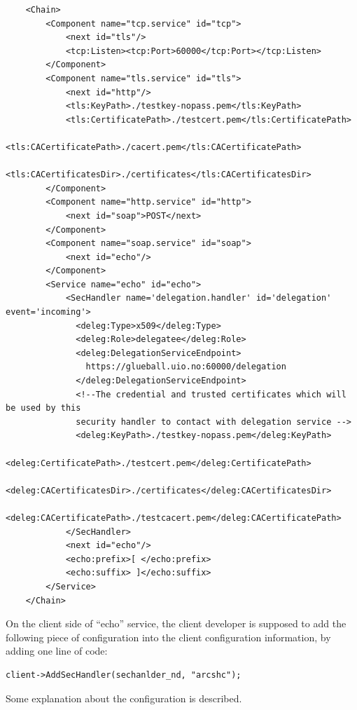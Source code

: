 \documentclass{article}                            %
\begin{document}
\begin{verbatim}
    <Chain>
        <Component name="tcp.service" id="tcp"> 
            <next id="tls"/> 
            <tcp:Listen><tcp:Port>60000</tcp:Port></tcp:Listen> 
        </Component> 
        <Component name="tls.service" id="tls"> 
            <next id="http"/> 
            <tls:KeyPath>./testkey-nopass.pem</tls:KeyPath> 
            <tls:CertificatePath>./testcert.pem</tls:CertificatePath> 
            <tls:CACertificatePath>./cacert.pem</tls:CACertificatePath> 
              <tls:CACertificatesDir>./certificates</tls:CACertificatesDir> 
        </Component> 
        <Component name="http.service" id="http"> 
            <next id="soap">POST</next> 
        </Component> 
        <Component name="soap.service" id="soap"> 
            <next id="echo"/> 
        </Component> 
        <Service name="echo" id="echo"> 
            <SecHandler name='delegation.handler' id='delegation' event='incoming'> 
              <deleg:Type>x509</deleg:Type> 
              <deleg:Role>delegatee</deleg:Role> 
              <deleg:DelegationServiceEndpoint>
                https://glueball.uio.no:60000/delegation
              </deleg:DelegationServiceEndpoint> 
              <!--The credential and trusted certificates which will be used by this 
              security handler to contact with delegation service -->
              <deleg:KeyPath>./testkey-nopass.pem</deleg:KeyPath> 
              <deleg:CertificatePath>./testcert.pem</deleg:CertificatePath> 
              <deleg:CACertificatesDir>./certificates</deleg:CACertificatesDir> 
              <deleg:CACertificatePath>./testcacert.pem</deleg:CACertificatePath> 
            </SecHandler> 
            <next id="echo"/> 
            <echo:prefix>[ </echo:prefix> 
            <echo:suffix> ]</echo:suffix> 
        </Service> 
    </Chain> 
\end{verbatim}

On the client side of ``echo'' service, the client developer is supposed to add the following piece of configuration into the client configuration information, by adding one line of code:

\begin{verbatim}
client->AddSecHandler(sechanlder_nd, "arcshc");
\end{verbatim}

Some explanation about the configuration is described.
\end{document}
